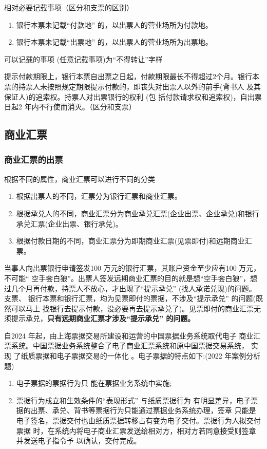 \documentclass[UTF8,12pt]{ctexart}
\numberwithin{equation}{section} %
\numberwithin{figure}{section}
\numberwithin{table}{section}
\begin{document}
	相对必要记载事项（区分和支票的区别）
	\begin{enumerate}
		\item 银行本票未记载“付款地” 的，以出票人的营业场所为付款地。 
		
		\item 银行本票未记载“出票地” 的，以出票人的营业场所为出票地。
	\end{enumerate}

	可以记载的事项 (任意记载事项)为“不得转让”字样
	
	提示付款期限上，银行本票自出票之日起，付款期限最长不得超过2个月。银行本票的持票人未按照规定期限提示付款的，即丧失对出票人以外的前手(背书人 及其保证人)的追索权。持票人对出票银行的权利 (包 括付款请求权和追索权)，自出票日起2 年内不行使而消灭。（区分和支票）
	
	
	
	\subsection{商业汇票}
	
	\subsubsection{商业汇票的出票} 
	根据不同的属性，商业汇票可以进行不同的分类
	\begin{enumerate}
		\item 根据出票人的不同，汇票分为银行汇票和商业汇票。 
		
		\item 根据承兑人的不同，商业汇票分为商业承兑汇票(企业出票、企业承兑)和银行承兑汇票(企业出票、银行承兑)。 
		
		\item 根据付款日期的不同，商业汇票分为即期商业汇票(见票即付)和远期商业汇票。 
	\end{enumerate}

	当事人向出票银行申请签发100 万元的银行汇票，其账户资金至少应有100 万元，不可能“ 空手套白狼”。出票人签发远期商业汇票的目的就是想“空手套白狼”，想 过几个月再付款，持票人不放心，才出现了“提示承兑” (找人承诺兑现)的问题。支票、 银行本票和银行汇票，均为见票即付的票据，不涉及“提示承兑” 的问题(既然可以马上 找银行去提示付款，没必要再去提示承兑了)。见票即付的商业汇票无须提示承兑，\textbf{只有远期商业汇票才涉及“提示承兑” 的问题。}
	
	自2024 年起，由上海票据交易所建设和运营的中国票据业务系统取代电子 商业汇票系统。中国票据业务系统整合了电子商业汇票系统和原中国票据交易系统， 实现 了纸质票据和电子票据交易的一体化 。电子票据的特点如下:(2022 年案例分析题)
	\begin{enumerate}
		\item 电子票据的票据行为只 能在票据业务系统中实施;
		
		\item 票据行为成立和生效条件的“表现形式” 与纸质票据行为 有明显差异，电子票据的出票、承兑、背书等票据行为只能通过票据业务系统办理，签章 只能是电子签名，票据交付也由纸质票据转移占有变为电子交付。票据行为人拟交付票据 时，在系统内将电子商业汇票发送给相对方，相对方若同意接受则签章并发送电子指令予 以确认，交付完成。
	\end{enumerate}
\end{document}

